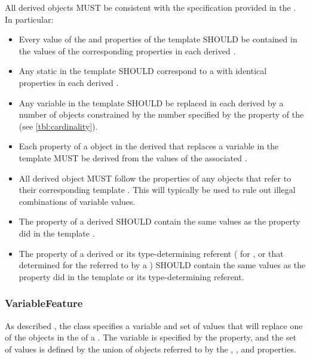 All derived objects MUST be consistent with the specification provided in the .
In particular:
\begin{itemize}
\item Every value of the  and  properties of the template  SHOULD be contained in the values of the corresponding properties in each derived .
\item Any static  in the template  SHOULD correspond to a  with identical properties in each derived .
\item Any variable  in the template  SHOULD be replaced in each derived  by a number of  objects constrained by the number specified by the  property of the  (see \ref{tbl:cardinality}).
\item Each property of a  object in the derived  that replaces a variable  in the template  MUST be derived from the values of the associated . 
\item All derived  object MUST follow the  properties of any  objects that refer to their corresponding template . This will typically be used to rule out illegal combinations of variable values.
\item The  property of a derived  SHOULD contain the same values as the  property did in the template . 
\item The  property of a derived  or its type-determining referent 
( for , or that determined for the  referred to by a )
SHOULD contain the same values as the  property did in the template  or its type-determining referent.
\end{itemize}



\subsubsection{VariableFeature}
\label{sec:VariableFeature}

As described , the   class specifies a variable and set of values that will replace one of the   objects in the  of a .
The variable is specified by the  property,
and the set of values is defined by the union of  objects referred to by the , , and  properties.

